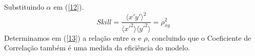 \documentclass{article}
\begin{document}
Substituindo $\alpha$ em (\ref{12}).
\begin{equation}
    Skill = \frac{\langle x'y' \rangle^2}{\langle x'^2 \rangle \langle y'^2 \rangle} = \rho_{xy}^2 \label{13}
\end{equation}
Determinamos em (\ref{13}) a relação entre $\alpha$ e $\rho$, concluindo que o Coeficiente de Correlação também é uma medida da eficiência do modelo. 
\end{document}
